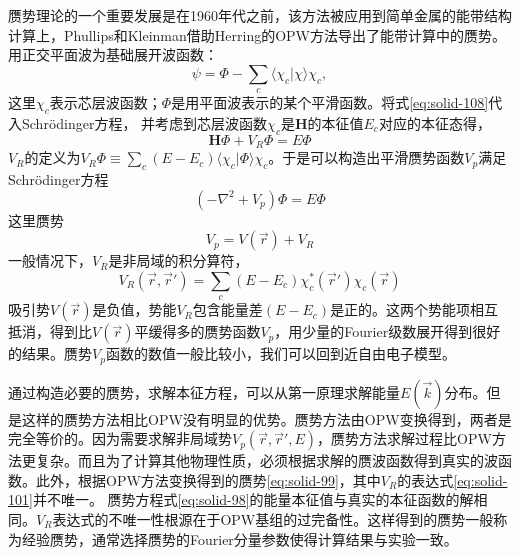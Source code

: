 赝势理论的一个重要发展是在1960年代之前，该方法被应用到简单金属的能带结构计算上，Phullips和Kleinman借助Herring的OPW方法导出了能带计算中的赝势\cite{pr116-287_1959}。用正交平面波为基础展开波函数：
\begin{equation}
  \psi=\Phi-\sum_c\langle\chi_c|\chi\rangle\chi_c,
  \label{eq:solid-108}
\end{equation}
这里$\chi_c$表示芯层波函数；$\Phi$是用平面波表示的某个平滑函数。将式\eqref{eq:solid-108}代入Schr\"odinger方程，%
并考虑到芯层波函数$\chi_c$是$\mathbf H$的本征值$E_c$对应的本征态得，%
\begin{equation}
  \mathbf H\Phi+V_R\Phi=E\Phi
  \label{eq:solid-97}
\end{equation}
$V_R$的定义为$V_R\Phi\equiv\sum\limits_c(E-E_c)\langle\chi_c|\Phi\rangle\chi_c$。于是可以构造出平滑赝势函数$V_p$满足Schr\"odinger方程
\begin{equation}
  (-\nabla^2+V_p)\Phi=E\Phi
  \label{eq:solid-98}
\end{equation}
这里赝势
\begin{equation}
  V_p=V(\vec r)+V_R
  \label{eq:solid-99}
\end{equation}
一般情况下，$V_R$是非局域的积分算符，%
\begin{equation}
  V_R(\vec r,\vec r')=\sum_c(E-E_c)\chi_c^{\ast}(\vec r')\chi_c(\vec r)
 \label{eq:solid-101}
\end{equation}
吸引势$V(\vec r)$是负值，势能$V_R$包含能量差$(E-E_c)$是正的。这两个势能项相互抵消，得到比$V(\vec r)$平缓得多的赝势函数$V_p$，用少量的Fourier级数展开得到很好的结果。赝势$V_p$函数的数值一般比较小，我们可以回到近自由电子模型。

通过构造必要的赝势，求解本征方程，可以从第一原理求解能量$E(\vec k)$分布。但是这样的赝势方法相比OPW没有明显的优势。赝势方法由OPW变换得到，两者是完全等价的。因为需要求解非局域势$V_p(\vec r,\vec r',E)$，赝势方法求解过程比OPW方法更复杂。而且为了计算其他物理性质，必须根据求解的赝波函数得到真实的波函数。此外，根据OPW方法变换得到的赝势\eqref{eq:solid-99}，其中$V_R$的表达式\eqref{eq:solid-101}并不唯一。%
赝势方程式\eqref{eq:solid-98}的能量本征值与真实的本征函数的解相同\cite{Harrison}。$V_R$表达式的不唯一性根源在于OPW基组的过完备性。这样得到的赝势一般称为经验赝势，通常选择赝势的Fourier分量参数使得计算结果与实验一致。

